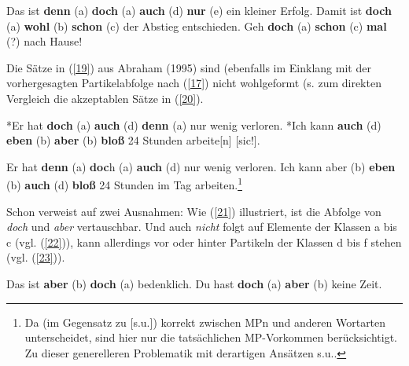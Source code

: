 \begin{exe}
	\ex\label{18} 
		\begin{xlist}	
			\ex\label{18a} Das ist \textbf{denn} (a) \textbf{doch} (a) \textbf{auch} (d) \textbf{nur} (e) ein kleiner Erfolg.
			\ex\label{18b} Damit ist \textbf{doch} (a) \textbf{wohl} (b) \textbf{schon} (c) der Abstieg entschieden.
			\ex\label{18c} Geh \textbf{doch} (a) \textbf{schon} (c) \textbf{mal} (?) nach Hause!
			\hfill\hbox {\citet[42]{Helbig1981}}
		\end{xlist}
\end{exe}
Die Sätze in (\ref{19}) aus Abraham (1995) sind (ebenfalls im Einklang mit der vorhergesagten Partikelabfolge nach (\ref{17}) nicht wohlgeformt (s. zum direkten Vergleich die akzeptablen Sätze in (\ref{20}).

\begin{exe}
	\ex\label{19} 
		\begin{xlist}	
			\ex\label{19a} *Er hat \textbf{doch} (a) \textbf{auch} (d) \textbf{denn} (a) nur wenig verloren.
			\ex\label{19b} *Ich kann \textbf{auch} (d) \textbf{eben} (b) \textbf{aber} (b) \textbf{bloß} 24 Stunden arbeite[n] 					[sic!].
		\end{xlist}
\end{exe}

\begin{exe}
	\ex\label{20} 
		\begin{xlist}	
			\ex\label{20a} Er hat \textbf{denn} (a) \textbf{doc}h (a) \textbf{auch} (d) nur wenig verloren.
			\ex\label{20b} Ich kann aber (b) \textbf{eben} (b) \textbf{auch} (d) \textbf{bloß} 24 Stunden im Tag arbeiten.\footnote{Da \citet{Abraham1995} (im Gegensatz zu \citealt{Engel1968} [s.u.]) korrekt zwischen MPn und anderen Wortarten unterscheidet, sind hier nur die tatsächlichen MP-Vorkommen berücksichtigt. Zu dieser generelleren Problematik mit derartigen Ansätzen s.u..}	
		\end{xlist}
		\hfill\hbox{\citet[248/249]{Abraham1995}}	
\end{exe}
Schon \citet{Engel1968} verweist auf zwei Ausnahmen: Wie (\ref{21}) illustriert, ist die Abfolge von \textit{doch} und \textit{aber} vertauschbar. Und auch \textit{nicht} folgt auf Elemente der Klassen a bis c (vgl. (\ref{22})), kann allerdings vor oder hinter Partikeln der Klassen d bis f stehen (vgl. (\ref{23})).

\begin{exe}
	\ex\label{21} 
		\begin{xlist}	
			\ex\label{21a} Das ist \textbf{aber} (b) \textbf{doch} (a) bedenklich.
			\ex\label{21b} Du hast \textbf{doch} (a) \textbf{aber} (b) keine Zeit.
		\end{xlist}
\end{exe}

